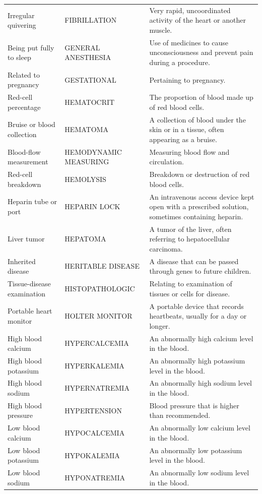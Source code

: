\begin{longtable}{>{\raggedright\arraybackslash}p{} >{\raggedright\arraybackslash}p{} >{\raggedright\arraybackslash}p{}}
Irregular quivering & FIBRILLATION & Very rapid, uncoordinated activity of the heart or another muscle. \\
Being put fully to sleep & GENERAL ANESTHESIA & Use of medicines to cause unconsciousness and prevent pain during a procedure. \\
Related to pregnancy & GESTATIONAL & Pertaining to pregnancy. \\
Red-cell percentage & HEMATOCRIT & The proportion of blood made up of red blood cells. \\
Bruise or blood collection & HEMATOMA & A collection of blood under the skin or in a tissue, often appearing as a bruise. \\
Blood-flow measurement & HEMODYNAMIC MEASURING & Measuring blood flow and circulation. \\
Red-cell breakdown & HEMOLYSIS & Breakdown or destruction of red blood cells. \\
Heparin tube or port & HEPARIN LOCK & An intravenous access device kept open with a prescribed solution, sometimes containing heparin. \\
Liver tumor & HEPATOMA & A tumor of the liver, often referring to hepatocellular carcinoma. \\
Inherited disease & HERITABLE DISEASE & A disease that can be passed through genes to future children. \\
Tissue-disease examination & HISTOPATHOLOGIC & Relating to examination of tissues or cells for disease. \\
Portable heart monitor & HOLTER MONITOR & A portable device that records heartbeats, usually for a day or longer. \\
High blood calcium & HYPERCALCEMIA & An abnormally high calcium level in the blood. \\
High blood potassium & HYPERKALEMIA & An abnormally high potassium level in the blood. \\
High blood sodium & HYPERNATREMIA & An abnormally high sodium level in the blood. \\
High blood pressure & HYPERTENSION & Blood pressure that is higher than recommended. \\
Low blood calcium & HYPOCALCEMIA & An abnormally low calcium level in the blood. \\
Low blood potassium & HYPOKALEMIA & An abnormally low potassium level in the blood. \\
Low blood sodium & HYPONATREMIA & An abnormally low sodium level in the blood. \\

\end{longtable}
